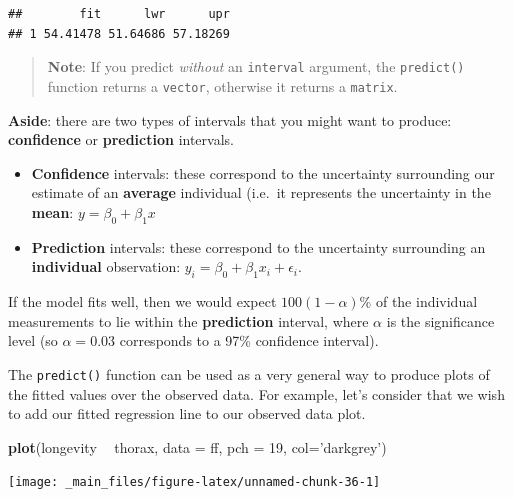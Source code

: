 \documentclass[]{book}
\newenvironment{Shaded}{\begin{snugshade}}{\end{snugshade}}
\newcommand{\KeywordTok}[1]{\textcolor[rgb]{0.13,0.29,0.53}{\textbf{#1}}}
\newcommand{\DataTypeTok}[1]{\textcolor[rgb]{0.13,0.29,0.53}{#1}}
\newcommand{\DecValTok}[1]{\textcolor[rgb]{0.00,0.00,0.81}{#1}}
\newcommand{\StringTok}[1]{\textcolor[rgb]{0.31,0.60,0.02}{#1}}
\newcommand{\OperatorTok}[1]{\textcolor[rgb]{0.81,0.36,0.00}{\textbf{#1}}}
\newcommand{\NormalTok}[1]{#1}
\providecommand{\tightlist}{%
  \setlength{\itemsep}{0pt}\setlength{\parskip}{0pt}}
\theoremstyle{definition}
\theoremstyle{definition}
\theoremstyle{definition}
\theoremstyle{remark}
\begin{document}
\begin{verbatim}
##        fit      lwr      upr
## 1 54.41478 51.64686 57.18269
\end{verbatim}

\begin{quote}
\textbf{Note}: If you predict \emph{without} an \texttt{interval}
argument, the \texttt{predict()} function returns a \texttt{vector},
otherwise it returns a \texttt{matrix}.
\end{quote}

\textbf{Aside}: there are two types of intervals that you might want to
produce: \textbf{confidence} or \textbf{prediction} intervals.

\begin{itemize}
\tightlist
\item
  \textbf{Confidence} intervals: these correspond to the uncertainty
  surrounding our estimate of an \textbf{average} individual (i.e.~it
  represents the uncertainty in the \textbf{mean}:
  \(y = \beta_0 + \beta_1 x\)
\item
  \textbf{Prediction} intervals: these correspond to the uncertainty
  surrounding an \textbf{individual} observation:
  \(y_i = \beta_0 + \beta_1 x_i + \epsilon_i\).
\end{itemize}

If the model fits well, then we would expect \(100(1 - \alpha)\)\% of
the individual measurements to lie within the \textbf{prediction}
interval, where \(\alpha\) is the significance level (so
\(\alpha = 0.03\) corresponds to a 97\% confidence interval).

\newpage

The \texttt{predict()} function can be used as a very general way to
produce plots of the fitted values over the observed data. For example,
let's consider that we wish to add our fitted regression line to our
observed data plot.

\begin{Shaded}
\begin{Highlighting}[]
\KeywordTok{plot}\NormalTok{(longevity }\OperatorTok{~}\StringTok{ }\NormalTok{thorax, }\DataTypeTok{data =}\NormalTok{ ff, }\DataTypeTok{pch =} \DecValTok{19}\NormalTok{, }\DataTypeTok{col=}\StringTok{'darkgrey'}\NormalTok{)}
\end{Highlighting}
\end{Shaded}

\begin{center}\texttt{[image: \_main\_files/figure-latex/unnamed-chunk-36-1]} \end{center}
\end{document}

